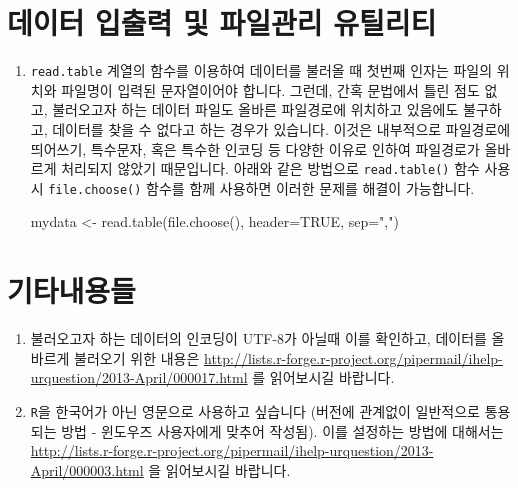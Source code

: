 \documentclass{article}
\begin{document}




%
%

\section{데이터 입출력 및 파일관리 유틸리티}
\begin{enumerate}
\item \texttt{read.table} 계열의 함수를 이용하여 데이터를 불러올 때 첫번째 인자는 파일의 위치와 파일명이 입력된 문자열이어야 합니다.
그런데, 간혹 문법에서 틀린 점도 없고, 불러오고자 하는 데이터 파일도 올바른 파일경로에 위치하고 있음에도 불구하고,
데이터를 찾을 수 없다고 하는 경우가 있습니다.
이것은 내부적으로 파일경로에 띄어쓰기, 특수문자, 혹은 특수한 인코딩 등 다양한 이유로 인하여 파일경로가 올바르게 처리되지 않았기 때문입니다.
아래와 같은 방법으로 \texttt{read.table()} 함수 사용시 \texttt{file.choose()} 함수를 함께 사용하면 이러한 문제를 해결이 가능합니다.


\begin{Schunk}
\begin{Soutput}
mydata <- read.table(file.choose(), header=TRUE, sep=",")
\end{Soutput}
\end{Schunk}


\end{enumerate}


%
%

\section{기타내용들}
\begin{enumerate}
\item 불러오고자 하는 데이터의 인코딩이 UTF-8가 아닐때 이를 확인하고, 데이터를 올바르게 불러오기 위한 내용은 \url{http://lists.r-forge.r-project.org/pipermail/ihelp-urquestion/2013-April/000017.html} 를 읽어보시길 바랍니다.

\item \texttt{R}을 한국어가 아닌 영문으로 사용하고 싶습니다 (버전에 관계없이 일반적으로 통용되는 방법 - 윈도우즈 사용자에게 맞추어 작성됨).
이를 설정하는 방법에 대해서는 \url{http://lists.r-forge.r-project.org/pipermail/ihelp-urquestion/2013-April/000003.html} 을 읽어보시길 바랍니다.
\end{enumerate}
\end{document}

